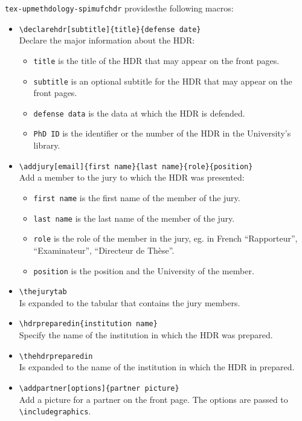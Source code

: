 \documentclass[english]{spimufchdr}
\begin{document}
\texttt{tex-upmethdology-spimufchdr} providesthe following macros:
\begin{itemize}
\item \texttt{{\textbackslash}declarehdr[subtitle]\{title\}\{defense date\}} \\
	Declare the major information about the HDR:
	\begin{itemize}
	\item \texttt{title} is the title of the HDR that may appear on the front pages.
	\item \texttt{subtitle} is an optional subtitle for the HDR that may appear on the front pages.
	\item \texttt{defense data} is the data at which the HDR is defended.
	\item \texttt{PhD ID} is the identifier or the number of the HDR in the University's library.
	\end{itemize}
\item \texttt{{\textbackslash}addjury[email]\{first name\}\{last name\}\{role\}\{position\}} \\
	Add a member to the jury to which the HDR was presented:
	\begin{itemize}
	\item \texttt{first name} is the first name of the member of the jury.
	\item \texttt{last name} is the last name of the member of the jury.
	\item \texttt{role} is the role of the member in the jury, eg. in French ``Rapporteur'', ``Examinateur'', ``Directeur de Th\`ese''.
	\item \texttt{position} is the position and the University of the member.
	\end{itemize}
\item \texttt{{\textbackslash}thejurytab} \\
	Is expanded to the tabular that contains the jury members.
\item \texttt{{\textbackslash}hdrpreparedin\{institution name\}} \\
	Specify the name of the institution in which the HDR was prepared.
\item \texttt{{\textbackslash}thehdrpreparedin} \\
	Is expanded to the name of the institution in which the HDR in prepared.
\item \texttt{{\textbackslash}addpartner[options]\{partner picture\}} \\
	Add a picture for a partner on the front page. The options are passed to \texttt{{\textbackslash}includegraphics}.

\end{itemize}
\end{document}

